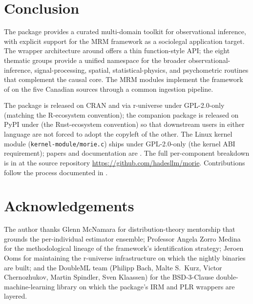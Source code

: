 \documentclass[article,shortnames,nojss]{jss}
\begin{document}
\section{Conclusion}
\label{sec:conclusion}

The  package  provides a curated
multi-domain toolkit for observational inference, with explicit
support for the MRM framework as a sociolegal application target.
The wrapper architecture around  offers a thin
function-style API; the eight thematic groups provide a unified
namespace for the broader observational-inference, signal-processing,
spatial, statistical-physics, and psychometric routines that
complement the causal core. The MRM modules implement the
framework of \citet{Ruhela2026MRM} on the five Canadian sources
through a common ingestion pipeline.

The  package is released on CRAN and via r-universe
under GPL-2.0-only (matching the R-ecosystem convention); the
companion  package is released on PyPI under
 (the Rust-ecosystem convention) so that
downstream users in either language are not forced to adopt the
copyleft of the other.  The Linux kernel module
(\texttt{kernel-module/morie.c}) ships under GPL-2.0-only (the
kernel ABI requirement); papers and documentation are
.  The full per-component breakdown is in
 at the source repository
\url{https://github.com/hadesllm/morie}.  Contributions follow
the process documented in .

\section*{Acknowledgements}

The author thanks Glenn McNamara for distribution-theory
mentorship that grounds the per-individual estimator ensemble;
Professor Angela Zorro Medina for the methodological lineage of
the framework's identification strategy; Jeroen Ooms for
maintaining the r-universe infrastructure on which the 
nightly binaries are built; and the DoubleML team (Philipp Bach,
Malte S.\ Kurz, Victor Chernozhukov, Martin Spindler, Sven
Klaassen) for the BSD-3-Clause double-machine-learning library on
which the package's IRM and PLR wrappers are layered.


\end{document}
